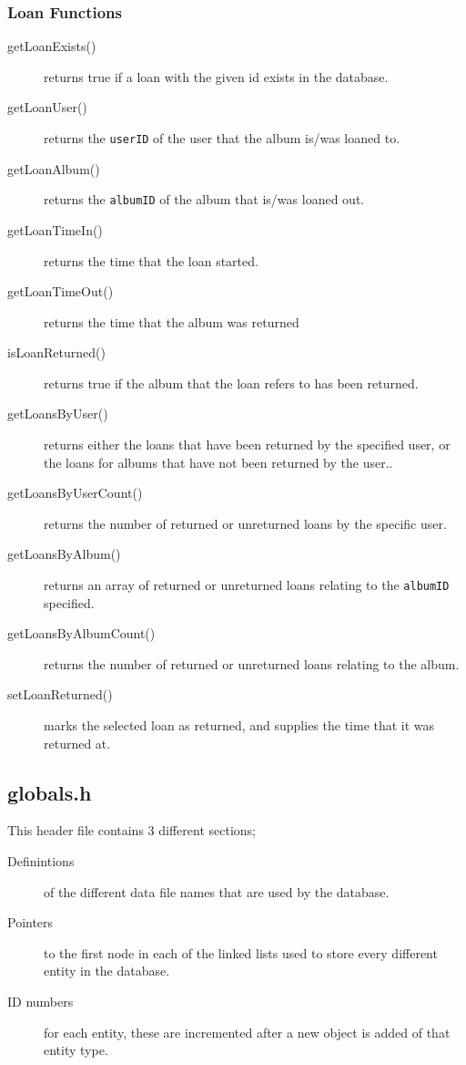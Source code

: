 \documentclass{article}
\begin{document}
\subsubsection{Loan Functions}
\begin{description}
\item[getLoanExists()] returns true if a loan with the given id exists in the database.
\item[getLoanUser()] returns the \verb|userID| of the user that the album is/was loaned to.
\item[getLoanAlbum()] returns the \verb|albumID| of the album that is/was loaned out.
\item[getLoanTimeIn()] returns the time that the loan started.
\item[getLoanTimeOut()] returns the time that the album was returned 
\item[isLoanReturned()] returns true if the album that the loan refers to has been returned.
\item[getLoansByUser()] returns either the loans that have been returned by the specified user, or the loans for albums that have not been returned by the user..
\item[getLoansByUserCount()] returns the number of returned or unreturned loans by the specific user.
\item[getLoansByAlbum()] returns an array of returned or unreturned loans relating to the \verb|albumID| specified. 
\item[getLoansByAlbumCount()] returns the number of returned or unreturned loans relating to the album.
\item[setLoanReturned()] marks the selected loan as returned, and supplies the time that it was returned at.
\end{description}

\subsection{globals.h}
This header file contains 3 different sections;
\begin{description}
\item[Definintions] of the different data file names that are used by the database.
\item[Pointers] to the first node in each of the linked lists used to store every different entity in the database.
\item[ID numbers] for each entity, these are incremented after a new object is added of that entity type.
\end{description}
\end{document}
